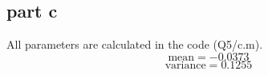 \subsection{part c}
All parameters are calculated in the code (Q5/c.m).
$$
\text{mean} = -0.0373
$$
$$
\text{variance} = 0.1255
$$
